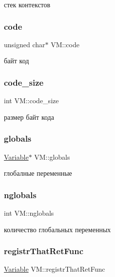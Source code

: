 стек контекстов \mbox{\label{struct_v_m_a760a936633eb5c7b8de120b5d78f9ba6}} 
\subsubsection{\texorpdfstring{code}{code}}
{\footnotesize\ttfamily unsigned char$\ast$ V\+M\+::code}

байт код \mbox{\label{struct_v_m_aa5f1f79d48c3a3512a232000f3eb4c26}} 
\subsubsection{\texorpdfstring{code\+\_\+size}{code\_size}}
{\footnotesize\ttfamily int V\+M\+::code\+\_\+size}

размер байт кода \mbox{\label{struct_v_m_a5a38d2d0aa60e11d8138fff312efb926}} 
\subsubsection{\texorpdfstring{globals}{globals}}
{\footnotesize\ttfamily \hyperlink{union_variable}{Variable}$\ast$ V\+M\+::globals}

глобалные переменные \mbox{\label{struct_v_m_a68946a4843ec05f3c865d177fa982dbe}} 
\subsubsection{\texorpdfstring{nglobals}{nglobals}}
{\footnotesize\ttfamily int V\+M\+::nglobals}

количество глобальных переменных \mbox{\label{struct_v_m_ac82f634bd85dcf9e68f615462f728b55}} 
\subsubsection{\texorpdfstring{registr\+That\+Ret\+Func}{registrThatRetFunc}}
{\footnotesize\ttfamily \hyperlink{union_variable}{Variable} V\+M\+::registr\+That\+Ret\+Func}

